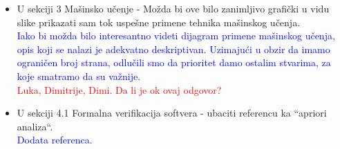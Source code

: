 \documentclass[a4paper]{report}
\newcommand{\odgovor}[1]{\textcolor{blue}{#1}}
\newcommand{\todo}[1]{\textcolor{red}{#1}}
\begin{document}
\begin{itemize}
  \item U sekciji 3 Mašinsko učenje - Možda bi ove bilo zanimljivo grafički u vidu slike prikazati sam tok uspešne primene tehnika mašinskog učenja.
  \\\odgovor{Iako bi možda bilo interesantno videti dijagram primene mašinskog učenja, opis koji se nalazi je adekvatno deskriptivan. Uzimajući u obzir da imamo ograničen broj strana, odlučili smo da prioritet damo ostalim stvarima, za koje smatramo da su važnije.}
  \\\todo{Luka, Dimitrije, Dimi. Da li je ok ovaj odgovor?}

  
  \item U sekciji 4.1 Formalna verifikacija softvera - ubaciti referencu ka ``apriori analiza``.
  \\\odgovor{Dodata referenca.}
  
\end{itemize}
\end{document}
